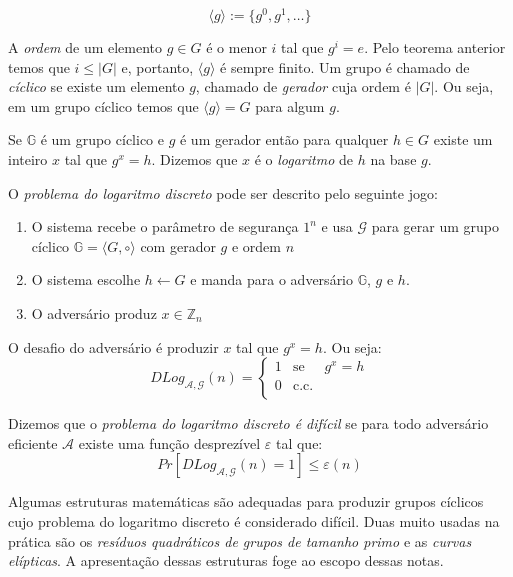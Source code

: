 \begin{displaymath}
  \langle g \rangle := \{g^0, g^1, \dots \}
\end{displaymath}

A {\em ordem} de um elemento $g \in G$ é o menor $i$ tal que $g^i = e$.
Pelo teorema anterior temos que $i \leq |G|$ e, portanto, $\langle g \rangle$ é sempre finito.
Um grupo é chamado de {\em cíclico} se existe um elemento $g$, chamado de {\em gerador} cuja ordem é $|G|$.
Ou seja, em um grupo cíclico temos que $\langle g \rangle = G$ para algum $g$.

Se $\mathbb{G}$ é um grupo cíclico e $g$ é um gerador então para qualquer $h \in G$ existe um inteiro $x$ tal que $g^x = h$.
Dizemos que $x$ é o {\em logaritmo} de $h$ na base $g$.

O {\em problema do logaritmo discreto} pode ser descrito pelo seguinte jogo:
\begin{enumerate}
\item O sistema recebe o parâmetro de segurança $1^n$ e usa $\mathcal{G}$ para gerar um grupo cíclico $\mathbb{G} = \langle G, \circ \rangle$ com gerador $g$ e ordem $n$
\item O sistema escolhe $h \leftarrow G$ e manda para o adversário $\mathbb{G}$, $g$ e $h$. 
\item O adversário produz $x \in \mathbb{Z}_n$
\end{enumerate}

O desafio do adversário é produzir $x$ tal que $g^x = h$.
Ou seja:
\begin{displaymath}
  DLog_{\mathcal{A}, \mathcal{G}}(n) = \left\{
    \begin{array}{lcl}
      1 & \textrm{se} & g^x = h\\
      0 & \textrm{c.c.} &\\
    \end{array}
    \right.
\end{displaymath}

Dizemos que o {\em problema do logaritmo discreto é difícil} se para todo adversário eficiente $\mathcal{A}$ existe uma função desprezível $\varepsilon$ tal que:
\begin{displaymath}
  Pr[DLog_{\mathcal{A}, \mathcal{G}}(n) = 1] \leq \varepsilon(n)
\end{displaymath}

Algumas estruturas matemáticas são adequadas para produzir grupos cíclicos cujo problema do logaritmo discreto é considerado difícil.
Duas muito usadas na prática são os {\em resíduos quadráticos de grupos de tamanho primo} e as {\em curvas elípticas}.
A apresentação dessas estruturas foge ao escopo dessas notas.

